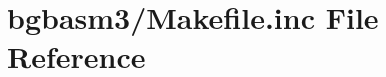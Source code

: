 \hypertarget{Makefile_8inc}{\section{bgbasm3/\-Makefile.inc File Reference}
\label{Makefile_8inc}
}
